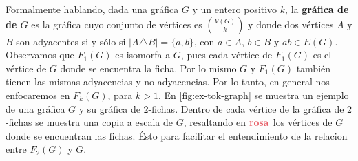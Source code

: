 Formalmente hablando, dada una gr\'afica $G$ y un entero positivo $k$, la
\textbf{gr\'afica de}  \textbf{de
$G$} es la gr\'afica cuyo conjunto de v\'ertices es
$\binom{V(G)}{k}$ y donde dos v\'ertices $A$ y $B$ son adyacentes si y s\'olo si
$|A \triangle B| = \{a,b\}$, con $a \in A$, $b \in B$ y $ab \in E(G)$.
Observamos que $F_1(G)$ es isomorfa a $G$, pues cada v\'ertice de $F_1(G)$ es el
v\'ertice de $G$ donde se encuentra la ficha. Por lo mismo $G$ y $F_1(G)$
tambi\'en tienen las mismas adyacencias y no adyacencias. Por lo tanto, en
general nos enfocaremos en $F_k(G)$, para $k > 1$. En \cref{fig:ex-tok-graph} se
muestra un ejemplo de una gr\'afica $G$ y su gr\'afica de $2$-fichas. Dentro de
cada v\'ertice de la gr\'afica de $2$-fichas se muestra una copia a escala de
$G$, resaltando en ${\color{rosa}\bf rosa}$ los v\'ertices de $G$ donde se
encuentran las fichas. \'Esto para facilitar el entendimiento de la relacion
entre $F_2(G)$ y $G$.

